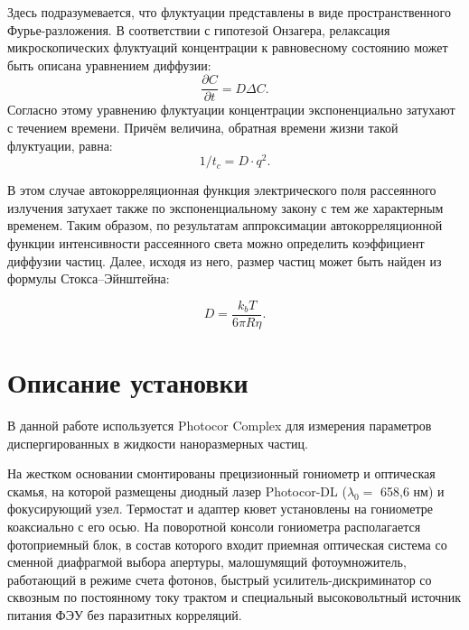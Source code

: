 \documentclass{article}
\begin{document}
Здесь подразумевается, что флуктуации представлены в виде пространственного Фурье-разложения. В соответствии с гипотезой Онзагера, релаксация микроскопических флуктуаций концентрации к равновесному состоянию может быть описана уравнением диффузии:
\begin{equation}
    \frac{\partial C}{\partial t} = D \Delta C.
\end{equation}
Согласно этому уравнению флуктуации концентрации экспоненциально затухают с течением времени.
Причём величина, обратная времени жизни такой флуктуации, равна:
\begin{equation}
    1/t_{c}= D \cdot q^2.
\end{equation}

В этом случае автокорреляционная функция электрического поля рассеянного излучения затухает также по экспоненциальному закону с тем же характерным временем.
Таким образом, по результатам аппроксимации автокорреляционной функции интенсивности рассеянного света можно определить коэффициент диффузии частиц. Далее, исходя из него, размер частиц может быть найден из формулы Стокса–Эйнштейна:

\begin{equation}
    D = \frac{k_{b} T}{6\pi R \eta}.
\end{equation}

\section{Описание установки}
В данной работе используется Photocor Complex для измерения параметров диспергированных в жидкости наноразмерных частиц. 

На жестком основании смонтированы прецизионный гониометр и оптическая скамья, на которой размещены диодный лазер Photocor-DL ($\lambda_{0}=$
658,6 нм) и фокусирующий узел. Термостат и адаптер кювет установлены на
гониометре коаксиально с его осью. На поворотной консоли гониометра располагается фотоприемный блок, в состав которого входит приемная оптическая
система со сменной диафрагмой выбора апертуры, малошумящий фотоумножитель, работающий в режиме счета фотонов, быстрый усилитель-дискриминатор
со сквозным по постоянному току трактом и специальный высоковольтный источник питания ФЭУ без паразитных корреляций. 
\end{document}
